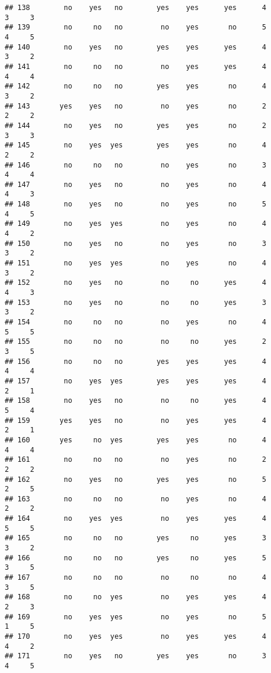 \documentclass[]{article}
\begin{document}
\begin{verbatim}
## 138        no    yes   no        yes    yes      yes      4        3     3
## 139        no     no   no         no    yes       no      5        4     5
## 140        no    yes   no        yes    yes      yes      4        3     2
## 141        no     no   no         no    yes      yes      4        4     4
## 142        no     no   no        yes    yes       no      4        3     2
## 143       yes    yes   no         no    yes       no      2        2     2
## 144        no    yes   no        yes    yes       no      2        3     3
## 145        no    yes  yes        yes    yes       no      4        2     2
## 146        no     no   no         no    yes       no      3        4     4
## 147        no    yes   no         no    yes       no      4        4     3
## 148        no    yes   no         no    yes       no      5        4     5
## 149        no    yes  yes         no    yes       no      4        4     2
## 150        no    yes   no         no    yes       no      3        3     2
## 151        no    yes  yes         no    yes       no      4        3     2
## 152        no    yes   no         no     no      yes      4        4     3
## 153        no    yes   no         no     no      yes      3        3     2
## 154        no     no   no         no    yes       no      4        5     5
## 155        no     no   no         no     no      yes      2        3     5
## 156        no     no   no        yes    yes      yes      4        4     4
## 157        no    yes  yes        yes    yes      yes      4        2     1
## 158        no    yes   no         no     no      yes      4        5     4
## 159       yes    yes   no         no    yes      yes      4        2     1
## 160       yes     no  yes        yes    yes       no      4        4     4
## 161        no     no   no         no    yes       no      2        2     2
## 162        no    yes   no        yes    yes       no      5        2     5
## 163        no     no   no         no    yes       no      4        2     2
## 164        no    yes  yes         no    yes      yes      4        5     5
## 165        no     no   no        yes     no      yes      3        3     2
## 166        no     no   no        yes     no      yes      5        3     5
## 167        no     no   no         no     no       no      4        3     5
## 168        no     no  yes         no    yes      yes      4        2     3
## 169        no    yes  yes         no    yes       no      5        1     5
## 170        no    yes  yes         no    yes      yes      4        4     2
## 171        no    yes   no        yes    yes       no      3        4     5

\end{verbatim}
\end{document}

